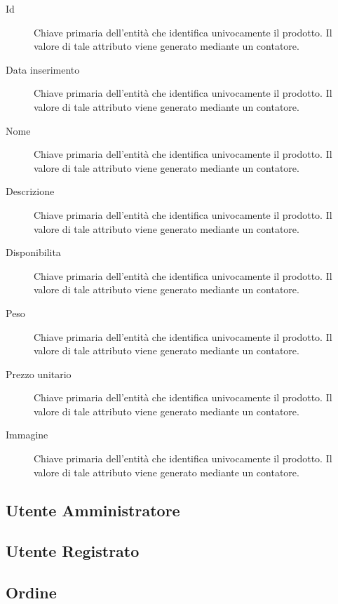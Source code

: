 	\begin{description}
		
		\item[Id]
		Chiave primaria dell'entità che identifica univocamente il prodotto. Il valore di tale attributo viene generato mediante un contatore.
		
		\item[Data inserimento]
		Chiave primaria dell'entità che identifica univocamente il prodotto. Il valore di tale attributo viene generato mediante un contatore.
		
		\item[Nome]
		Chiave primaria dell'entità che identifica univocamente il prodotto. Il valore di tale attributo viene generato mediante un contatore.
		
		\item[Descrizione]
		Chiave primaria dell'entità che identifica univocamente il prodotto. Il valore di tale attributo viene generato mediante un contatore.
		
		\item[Disponibilita]
		Chiave primaria dell'entità che identifica univocamente il prodotto. Il valore di tale attributo viene generato mediante un contatore.
		
		\item[Peso]
		Chiave primaria dell'entità che identifica univocamente il prodotto. Il valore di tale attributo viene generato mediante un contatore.
		
		\item[Prezzo unitario]
		Chiave primaria dell'entità che identifica univocamente il prodotto. Il valore di tale attributo viene generato mediante un contatore.
		
		\item[Immagine]
		Chiave primaria dell'entità che identifica univocamente il prodotto. Il valore di tale attributo viene generato mediante un contatore.
		
	\end{description}
	
	\subsection{Utente Amministratore}
	
	\subsection{Utente Registrato}
	
	\subsection{Ordine}
	
